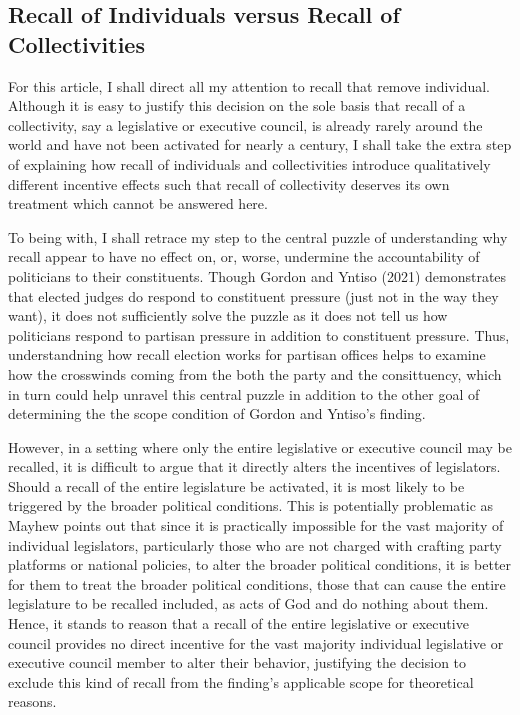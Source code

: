 \documentclass[hyphens, crop=false]{standalone}
\begin{document}
		\subsection*{Recall of Individuals versus Recall of Collectivities}
		For this article, I shall direct all my attention to recall that remove individual.
		Although it is easy to justify this decision on the sole basis that
		recall of a collectivity,
		say a legislative or executive council,
		is already rarely around the world and have not been activated for nearly a century,
		I shall take the extra step of explaining
		how recall of individuals and collectivities
		introduce qualitatively different incentive effects
		such that recall of collectivity deserves its own treatment which cannot be answered here.

		To being with,
		I shall retrace my step to the central puzzle of understanding why
		recall appear to have no effect on,
		or, worse, undermine the accountability of politicians to their constituents.
		Though Gordon and Yntiso (2021)
		demonstrates that elected judges do respond to constituent pressure (just not in the way they want),
		it does not sufficiently solve the puzzle as
		it does not tell us how politicians respond to partisan pressure in addition to constituent pressure.
		Thus,
		understandning how recall election works for partisan offices helps to examine how
		the crosswinds coming from the both the party and the consittuency,
		which in turn
		could help unravel this central puzzle
		in addition to the other goal of
		determining the
		the scope condition of
		Gordon and Yntiso's
		finding.
		
		However,
		in a setting where only
		the entire
		legislative or executive council may be recalled,
		it is difficult to argue that it directly alters the incentives of legislators.
		Should a recall of the entire legislature
		be activated,
		it is most likely to be triggered by
		the broader political conditions.
		This is potentially problematic as
		Mayhew
		\autocite*{mayhewCongressElectoralConnection1974}
		points out that since
		it is practically impossible for the vast majority of
		individual legislators,
		particularly those who are not charged with crafting party platforms or national policies,
		to alter the broader political conditions,
		it is better for them to treat the broader political conditions,
		those that can cause the entire legislature to be recalled included,
		as acts of God and do nothing about them.
		Hence, it stands to reason that a recall of the entire legislative or executive council
		provides no direct incentive for the vast majority individual legislative or executive council member
		to alter their behavior,
		justifying the decision to exclude this kind of recall from the finding's applicable scope for theoretical reasons.
\end{document}
